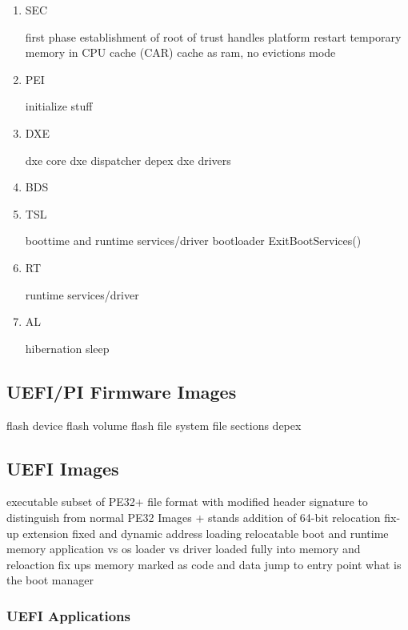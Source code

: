 \begin{enumerate}
    \item{\acf{SEC}}

    first phase
    establishment of root of trust
    handles platform restart
    temporary memory in CPU cache (CAR) cache as ram, no evictions mode

    \item{\acf{PEI}}

    initialize stuff

    \item{\acf{DXE}}

    dxe core
    dxe dispatcher
    depex
    dxe drivers

    \item{\acf{BDS}}


    \item{\acf{TSL}}

    boottime and runtime services/driver
    bootloader
    ExitBootServices()

    \item{\acf{RT}}

    runtime services/driver

    \item{\acf{AL}}

    hibernation
    sleep

\end{enumerate}

\subsection{\acs{UEFI}/\acs{PI} Firmware Images}

flash device
flash volume
flash file system
file sections
depex

\subsection{\acs{UEFI} Images}

executable
subset of PE32+ file format with modified header signature to distinguish from normal PE32 Images
+ stands addition of 64-bit relocation fix-up extension
fixed and dynamic address loading
relocatable
boot and runtime memory
application vs os loader vs driver
loaded fully into memory and reloaction fix ups
memory marked as code and data
jump to entry point
what is the boot manager

\subsubsection{\acs{UEFI} Applications}

